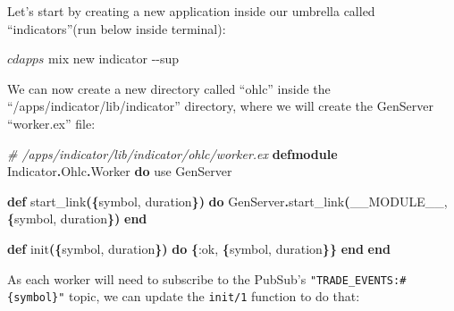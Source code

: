 \documentclass[
  oneside]{book}
\newenvironment{Shaded}{\begin{snugshade}}{\end{snugshade}}
\newcommand{\AttributeTok}[1]{\textcolor[rgb]{0.13,0.29,0.53}{#1}}
\newcommand{\CommentTok}[1]{\textcolor[rgb]{0.56,0.35,0.01}{\textit{#1}}}
\newcommand{\ConstantTok}[1]{\textcolor[rgb]{0.56,0.35,0.01}{#1}}
\newcommand{\ExtensionTok}[1]{#1}
\newcommand{\FunctionTok}[1]{\textcolor[rgb]{0.13,0.29,0.53}{\textbf{#1}}}
\newcommand{\ImportTok}[1]{#1}
\newcommand{\KeywordTok}[1]{\textcolor[rgb]{0.13,0.29,0.53}{\textbf{#1}}}
\newcommand{\NormalTok}[1]{#1}
\newcommand{\OperatorTok}[1]{\textcolor[rgb]{0.81,0.36,0.00}{\textbf{#1}}}
\newcommand{\VariableTok}[1]{\textcolor[rgb]{0.00,0.00,0.00}{#1}}
\begin{document}
Let's start by creating a new application inside our umbrella called ``indicators''(run below inside terminal):

\begin{Shaded}
\begin{Highlighting}[]
\ExtensionTok{$}\NormalTok{ cd apps }
\ExtensionTok{$}\NormalTok{ mix new indicator }\AttributeTok{{-}{-}sup}
\end{Highlighting}
\end{Shaded}

We can now create a new directory called ``ohlc'' inside the ``/apps/indicator/lib/indicator'' directory, where we will create the GenServer ``worker.ex'' file:

\begin{Shaded}
\begin{Highlighting}[]
\CommentTok{\# /apps/indicator/lib/indicator/ohlc/worker.ex}
\KeywordTok{defmodule} \ConstantTok{Indicator}\OperatorTok{.}\ConstantTok{Ohlc}\OperatorTok{.}\ConstantTok{Worker} \KeywordTok{do}
  \ImportTok{use} \ConstantTok{GenServer}

  \KeywordTok{def}\NormalTok{ start\_link}\FunctionTok{(\{}\NormalTok{symbol, duration}\FunctionTok{\})} \KeywordTok{do}
    \ConstantTok{GenServer}\OperatorTok{.}\NormalTok{start\_link}\FunctionTok{(}\ConstantTok{\_\_MODULE\_\_}\NormalTok{, }\FunctionTok{\{}\NormalTok{symbol, duration}\FunctionTok{\})}
  \KeywordTok{end}

  \KeywordTok{def}\NormalTok{ init}\FunctionTok{(\{}\NormalTok{symbol, duration}\FunctionTok{\})} \KeywordTok{do}
    \FunctionTok{\{}\VariableTok{:ok}\NormalTok{, }\FunctionTok{\{}\NormalTok{symbol, duration}\FunctionTok{\}\}}
  \KeywordTok{end}
\KeywordTok{end}
\end{Highlighting}
\end{Shaded}

\newpage

As each worker will need to subscribe to the PubSub's \texttt{"TRADE\_EVENTS:\#\{symbol\}"} topic, we can update the \texttt{init/1} function to do that:
\end{document}
